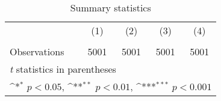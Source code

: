 \begin{table}[htbp]\centering
\def\sym#1{\ifmmode^{#1}\else\(^{#1}\)\fi}
\caption{Summary statistics\label{tab1}}
\begin{tabular}{l*{4}{c}}
\hline\hline
                    &\multicolumn{1}{c}{(1)}&\multicolumn{1}{c}{(2)}&\multicolumn{1}{c}{(3)}&\multicolumn{1}{c}{(4)}\\
                    &\multicolumn{1}{c}{} &\multicolumn{1}{c}{} &\multicolumn{1}{c}{} &\multicolumn{1}{c}{} \\
\hline
\hline
Observations        &        5001         &        5001         &        5001         &        5001         \\
\hline\hline
\multicolumn{5}{l}{\footnotesize \textit{t} statistics in parentheses}\\
\multicolumn{5}{l}{\footnotesize \sym{*} \(p<0.05\), \sym{**} \(p<0.01\), \sym{***} \(p<0.001\)}\\
\end{tabular}
\end{table}
